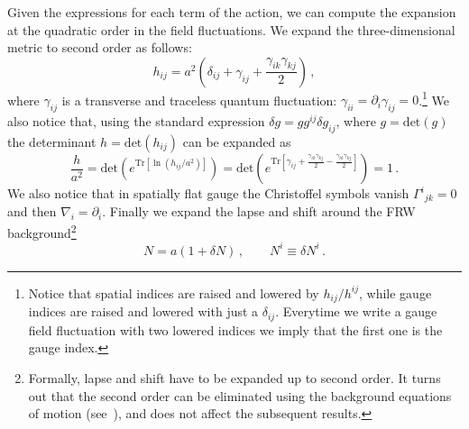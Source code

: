 Given the expressions for each term of the action, we can compute the expansion at  the quadratic order in the field fluctuations. We expand the three-dimensional metric to second order as follows:
\begin{equation}
h_{ij} = a^2 \left(\delta_{ij} + \gamma_{ij} + \frac{\gamma_{ik} \gamma_{kj}}{2} \right) \,,
\end{equation}
where $\gamma_{ij}$ is a transverse and traceless quantum fluctuation: $\gamma_{ii} = \partial_i \gamma_{ij} = 0$.\footnote{Notice that spatial indices are raised and lowered by $h_{ij}/h^{ij}$, while gauge indices are raised and lowered with just a $\delta_{ij}$. Everytime we write a gauge field fluctuation with two lowered indices we imply that the first one is the gauge index.} We also notice that, using the standard expression $\delta g = g g^{ij} \delta g_{ij}$, where $g = \text{det}(g)$ the determinant $h = \text{det}(h_{ij})$ can be expanded as
\begin{equation}
\frac{h}{a^2} = \text{det} \left(e^{\text{Tr} \left[\ln (h_{ij}/a^2)\right]}\right) = \text{det} \left(e^{\text{Tr} \left[ \gamma_{ij} + \frac{\gamma_{ik}\gamma_{kj}}{2} - \frac{\gamma_{ik}\gamma_{kj}}{2} \right]}\right) = 1 \,.
\end{equation}
We also notice that in spatially flat gauge the Christoffel symbols vanish ${\Gamma^i}_{jk} = 0$ and then $\nabla_i = \partial_i$. Finally we expand the lapse and shift around the FRW background\footnote{{Formally, lapse and shift have to be expanded up to second order. It turns out that the second order can be eliminated using the background equations of motion (see~\cite{Adshead:2013nka}), and does not affect the subsequent results.}}
\begin{equation}
N = a \left(1+ \delta N\right) \,, \qquad N^i \equiv \delta N^i\,.
\end{equation}

